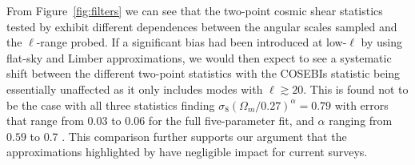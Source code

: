 From Figure~\ref{fig:filters} we can see that the two-point cosmic shear statistics tested by \citet{kilbinger/etal:2013} exhibit different dependences between the angular scales sampled and the $\ell$-range probed.   
If a significant bias had been introduced at low-$\ell$ by using flat-sky and Limber approximations, we would then expect to see a systematic shift between the different two-point statistics with the COSEBIs statistic being essentially unaffected as it only includes modes with $\ell \gtrsim 20$.  This is found not to be the case with all three statistics finding $\sigma_8 (\Omega_m/0.27)^\alpha = 0.79$ with errors that range from $0.03$ to $0.06$ for the full five-parameter fit, and $\alpha$ ranging from $0.59$ to 0.7 \citep[see Table 5 of][]{kilbinger/etal:2013}.  This comparison further supports our argument that the approximations highlighted by \citet{kitching/etal:2016} have negligible impact for current surveys.

